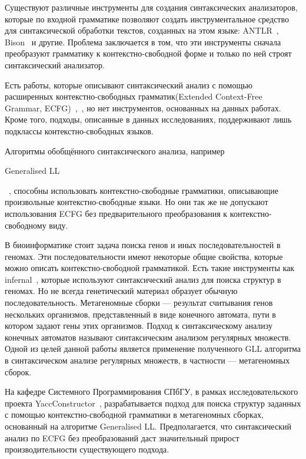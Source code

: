 \documentclass[14pt]{matmex-diploma-custom}
\begin{document}
	Существуют различные инструменты для создания синтаксических анализаторов, которые 
	по входной грамматике позволяют создать инструментальное средство для синтаксической 
	обработки текстов, созданных на этом языке: ANTLR~\cite{ANTLR}, Bison~\cite{Bison} и другие.
	Проблема заключается в том, что эти инструменты
	сначала преобразуют грамматику к контекстно-свободной форме и только по ней 
	строят синтаксический анализатор.
	
	Есть работы, которые описывают синтаксический анализ с помощью расширенных
	контекстно-свободных грамматик(Extended Context-Free Grammar, ECFG)~\cite{Breveglieri2014},~\cite{lee1997characterization},
	но нет инструментов, основанных на данных работах. Кроме того, подходы, описанные
	в данных исследованиях, поддерживают лишь подклассы контекстно-свободных языков.
	
	Алгоритмы обобщённого синтаксического анализа, например
    \begin{english} Generalised LL \end{english}~\cite{scott2010gll}, 
	способны использовать контекстно-свободные грамматики, описывающие произвольные 
	контекстно-свободные языки. Но они так же не допускают использования ECFG 
	без предварительного преобразования к контекстно-свободному виду.
	
	В биоинформатике стоит задача поиска генов и иных последовательностей в геномах. 
	Эти последовательности имеют некоторые общие свойства, которые можно описать 
	контекстно-свободной грамматикой. Есть такие инструменты как infernal~\cite{Infernal}, которые 
	используют синтаксический анализ для поиска структур в геномах. Но не всегда 
	генетический материал образует обычную последовательность. Метагеномные сборки ---
	результат считывания генов нескольких организмов, представленный в виде конечного автомата, пути 
	в котором задают гены этих организмов. Подход к синтаксическому анализу конечных автоматов называют 
    синтаксическим анализом регулярных множеств. Одной из целей данной работы является применение
    полученного GLL алгоритма в
	синтаксическом анализе регулярных множеств, в частности --- метагеномных сборок.
	
	На кафедре Системного Программирования СПбГУ, в рамках исследовательского проекта \newline YaccConstructor~\cite{YaccConstructor},
	разрабатывается подход для поиска структур заданных с помощью контекстно-свободной
	грамматики в метагеномных сборках, основанный на алгоритме Generalised LL.
	Предполагается, что синтаксический анализ по ECFG без преобразований даст значительный
	прирост производительности существующего подхода.
	
\end{document}
